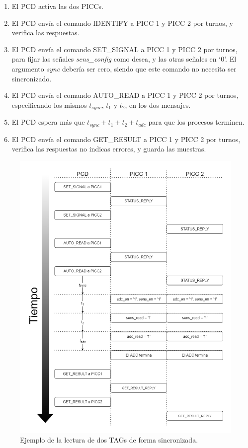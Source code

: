 \documentclass[a4paper, twoside, 11pt]{report}
\begin{document}
\begin{enumerate}
  \item El PCD activa las dos PICCs.
  \item El PCD envía el comando IDENTIFY a PICC 1 y PICC 2 por turnos, y verifica las respuestas.
  \item El PCD envía el comando SET\_SIGNAL a PICC 1 y PICC 2 por turnos, para fijar las señales \textit{sens\_config} como desea, y las otras señales en ‘0’. El argumento \textit{sync} debería ser cero, siendo que este comando no necesita ser sincronizado.
  \item El PCD envía el comando AUTO\_READ a PICC 1 y PICC 2 por turnos, especificando los mismos  $t_{sync}$, $t_1$ y $t_2$, en los dos mensajes.
  \item El PCD espera más que $t_{sync} + t_1 + t_2 + t_{adc}$ para que los procesos terminen.
  \item El PCD envía el comando GET\_RESULT a PICC 1 y PICC 2 por turnos, verifica las respuestas no indicas errores, y guarda las muestras.
\end{enumerate}

\begin{figure}[htb]
  \centering
  \includegraphics[width=1.0\textwidth]{./img/app_flow2.drawio}
  \caption{Ejemplo de la lectura de dos TAGs de forma sincronizada.}
  \label{fig:app_flow}
\end{figure}
\end{document}
